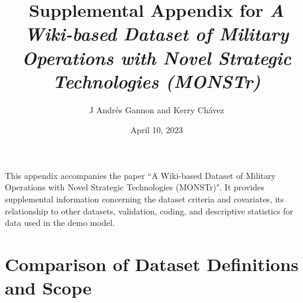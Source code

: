 \documentclass[fleqn,12pt]{article}
\title{\singlespacing Supplemental Appendix for \textit{A Wiki-based Dataset of Military Operations with Novel Strategic Technologies (MONSTr)}}
\author{J Andr\'{e}s Gannon and Kerry Ch\'{a}vez}
\date{April 10, 2023}
\begin{document}
\maketitle

\doublespacing
\renewcommand\thetable{A\arabic{table}}
\renewcommand\thefigure{A\arabic{figure}}
\thispagestyle{empty}

This appendix accompanies the paper ``A Wiki-based Dataset of Military Operations with Novel Strategic Technologies (MONSTr)". It provides supplemental information concerning the dataset criteria and covariates, its relationship to other datasets, validation, coding, and descriptive statistics for data used in the demo model.

\tableofcontents

\newpage
\section{Comparison of Dataset Definitions and Scope}
\end{document}
